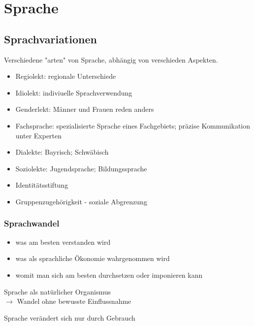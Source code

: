 
\section{Sprache}


\subsection{Sprachvariationen}

Verschiedene "arten" von Sprache, abhängig von verschieden Aspekten.

\begin{itemize}
    \item Regiolekt: regionale Unterschiede
    \item Idiolekt: indiviuelle Sprachverwendung
    \item Genderlekt: Männer und Frauen reden anders
    \item Fachsprache: spezialisierte Sprache eines Fachgebiets; präzise Kommunikation unter Experten
    \item Dialekte: Bayrisch; Schwäbisch
    \item Soziolekte: Jugendsprache; Bildungssprache
\end{itemize}

\begin{itemize}
    \item Identitätsstiftung
    \item Gruppenzugehörigkeit - soziale Abgrenzung
\end{itemize}


\subsubsection{Sprachwandel}

\begin{itemize}
    \item was am besten verstanden wird
    \item was als sprachliche Ökonomie wahrgenommen wird
    \item womit man sich am besten durchsetzen oder imponieren kann
\end{itemize}

Sprache als natürlicher Organismus \\
$\rightarrow$ Wandel ohne bewusste Einflussnahme

Sprache verändert sich nur durch Gebrauch

